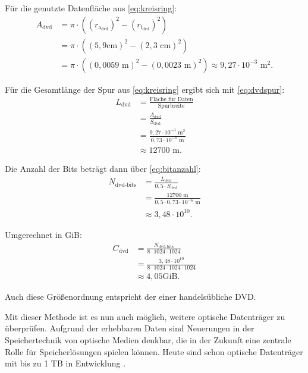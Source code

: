 \documentclass[9pt,twocolumn,twoside]{pnas-new}
\begin{document}
Für die genutzte Datenfläche aus \eqref{eq:kreisring}:
\begin{align*}
 A_{\mbox{dvd}} &= \pi\cdot((r_{\mbox{a}_{\mbox{dvd}}})^2-(r_{\mbox{i}_{\mbox{dvd}}})^2)  \\	
&= \pi\cdot((5,9\mbox{cm})^2-(2,3\mbox{ cm})^2) \\
 &=  \pi\cdot((0,0059\mbox{ m})^2-(0,0023\mbox{ m})^2) \approx 9,27\cdot10^{-3}\mbox{ m}^2.
\end{align*}

Für die Gesamtlänge der Spur aus \eqref{eq:kreisring} ergibt sich mit \eqref{eq:dvdspur}:
\begin{align*}
 L_{\mbox{dvd}} &= \frac{\mbox{Fläche für Daten}}{\mbox{Spurbreite}}\\
 &= \frac{A_{\mbox{dvd}}}{S_{\mbox{dvd}}}\\
 &= \frac{9,27\cdot10^{-3}\mbox{ m}^2}{0,73\cdot10^{-6}\mbox{ m} }\\
 &\approx 12700\mbox{ m}.
\end{align*}

Die Anzahl der Bits beträgt dann über \eqref{eq:bitanzahl}:
\begin{align*}
N_{\mbox{dvd-bits}} &=  \frac{L_{\mbox{dvd}}}{0,5\cdot S_{\mbox{dvd}}}\\
&= \frac{12700\mbox{ m}}{0,5\cdot 0,73\cdot10^{-6}\mbox{ m}}\\
&\approx 3,48\cdot 10^{10}.
\end{align*}

Umgerechnet in GiB:
\begin{align*}
C_{\mbox{dvd}} &= \frac{N_{\mbox{dvd-bits}}}{8\cdot1024\cdot1024}\\
&= \frac{3,48\cdot10^{10}}{8\cdot1024\cdot1024\cdot1024}\\
&\approx 4,05\mbox{GiB}.
\end{align*}

Auch diese Größenordnung entspricht der einer handelsübliche DVD.


Mit dieser Methode ist es nun auch möglich, weitere optische Datenträger zu überprüfen.
Aufgrund der erhebbaren Daten sind Neuerungen in der Speichertechnik von optische Medien denkbar, die in der Zukunft eine zentrale Rolle für Speicherlösungen spielen können. Heute sind schon optische Datenträger mit bis zu 1 TB in Entwicklung \cite{SonyPressStatement}.





\end{document}
